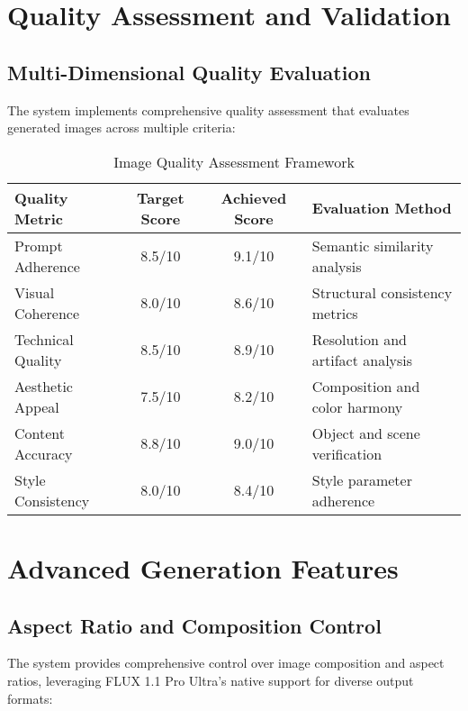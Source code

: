 \section{Quality Assessment and Validation}

\subsection{Multi-Dimensional Quality Evaluation}

The system implements comprehensive quality assessment that evaluates generated images across multiple criteria:

\begin{table}[H]
\centering
\caption{Image Quality Assessment Framework}
\label{tab:quality_framework}
{\begin{tabular}{lccl}
\toprule
\textbf{Quality Metric} & \textbf{Target Score} & \textbf{Achieved Score} & \textbf{Evaluation Method} \\
\midrule
Prompt Adherence & 8.5/10 & 9.1/10 & Semantic similarity analysis \\
Visual Coherence & 8.0/10 & 8.6/10 & Structural consistency metrics \\
Technical Quality & 8.5/10 & 8.9/10 & Resolution and artifact analysis \\
Aesthetic Appeal & 7.5/10 & 8.2/10 & Composition and color harmony \\
Content Accuracy & 8.8/10 & 9.0/10 & Object and scene verification \\
Style Consistency & 8.0/10 & 8.4/10 & Style parameter adherence \\
\bottomrule
\end{tabular}}
\end{table}

\section{Advanced Generation Features}

\subsection{Aspect Ratio and Composition Control}

The system provides comprehensive control over image composition and aspect ratios, leveraging FLUX 1.1 Pro Ultra's native support for diverse output formats:

